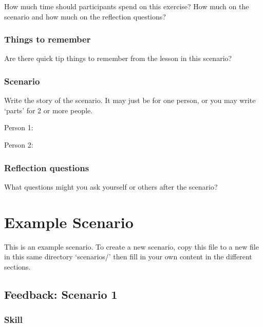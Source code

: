 \documentclass[
  letterpaper,
  DIV=11,
  numbers=noendperiod]{scrreprt}
\begin{document}
How much time should participants spend on this exercise? How much on
the scenario and how much on the reflection questions?

\hypertarget{things-to-remember}{%
\subsection*{Things to remember}\label{things-to-remember}}

Are there quick tip things to remember from the lesson in this scenario?

\hypertarget{scenario}{%
\subsection*{Scenario}\label{scenario}}

Write the story of the scenario. It may just be for one person, or you
may write `parts' for 2 or more people.

Person 1:

Person 2:

\hypertarget{reflection-questions}{%
\subsection*{Reflection questions}\label{reflection-questions}}

What questions might you ask yourself or others after the scenario?

\hypertarget{example-scenario}{%
\chapter*{Example Scenario}\label{example-scenario}}

This is an example scenario. To create a new scenario, copy this file to
a new file in this same directory `scenarios/' then fill in your own
content in the different sections.

\hypertarget{feedback-scenario-1}{%
\section*{Feedback: Scenario 1}\label{feedback-scenario-1}}

\hypertarget{skill-1}{%
\subsection*{Skill}\label{skill-1}}
\end{document}
